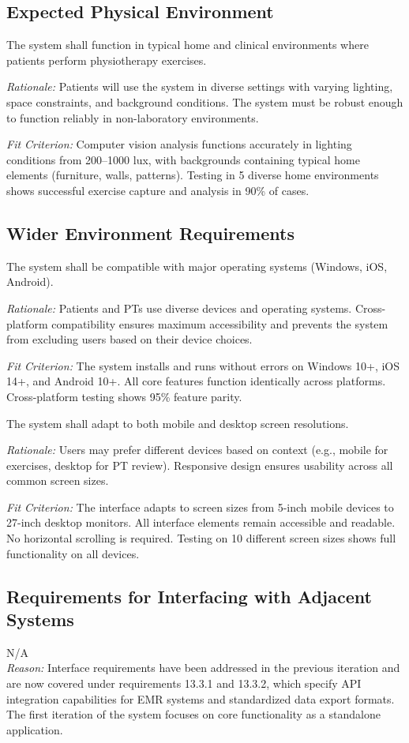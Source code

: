 \documentclass[12pt]{article}
\newcommand{\rationale}[1]{\par\emph{Rationale:} #1}
\newcommand{\fitcrit}[1]{\par\emph{Fit Criterion:} #1}
\begin{document}
\subsection{Expected Physical Environment}
\begin{reqlist}
	\item[OER-EP 1.] The system shall function in typical home and clinical environments where patients perform physiotherapy exercises.
	\rationale{Patients will use the system in diverse settings with varying lighting, space constraints, and background conditions. The system must be robust enough to function reliably in non-laboratory environments.}
	\fitcrit{Computer vision analysis functions accurately in lighting conditions from 200--1000 lux, with backgrounds containing typical home elements (furniture, walls, patterns). Testing in 5 diverse home environments shows successful exercise capture and analysis in 90\% of cases.}
\end{reqlist}

\subsection{Wider Environment Requirements}
\begin{reqlist}
	\item[OER-WE 1.] The system shall be compatible with major operating systems (Windows, iOS, Android).
	\rationale{Patients and PTs use diverse devices and operating systems. Cross-platform compatibility ensures maximum accessibility and prevents the system from excluding users based on their device choices.}
	\fitcrit{The system installs and runs without errors on Windows 10+, iOS 14+, and Android 10+. All core features function identically across platforms. Cross-platform testing shows 95\% feature parity.}
	
	\item[OER-WE 2.] The system shall adapt to both mobile and desktop screen resolutions.
	\rationale{Users may prefer different devices based on context (e.g., mobile for exercises, desktop for PT review). Responsive design ensures usability across all common screen sizes.}
	\fitcrit{The interface adapts to screen sizes from 5-inch mobile devices to 27-inch desktop monitors. All interface elements remain accessible and readable. No horizontal scrolling is required. Testing on 10 different screen sizes shows full functionality on all devices.}
\end{reqlist}

\subsection{Requirements for Interfacing with Adjacent Systems}
\noindent N/A \\
\textit{Reason:} Interface requirements have been addressed in the previous iteration and are now covered under requirements 13.3.1 and 13.3.2, which specify API integration capabilities for EMR systems and standardized data export formats. The first iteration of the system focuses on core functionality as a standalone application.
\end{document}
